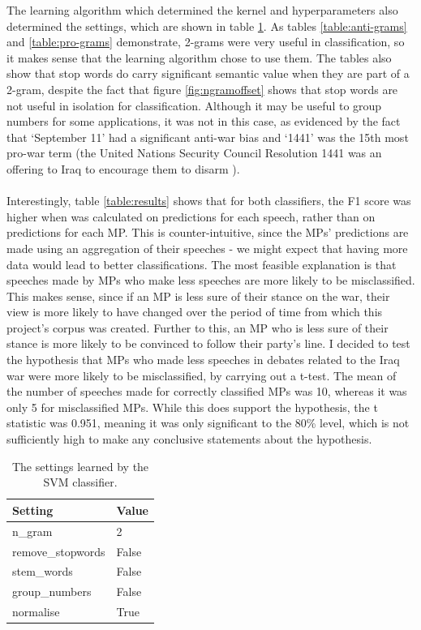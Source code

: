 \documentclass[12pt,a4paper,twoside,openright]{report}
\begin{document}
The learning algorithm which determined the kernel and hyperparameters also determined the settings, which are shown in table \ref{table:settings}. As tables \ref{table:anti-grams} and \ref{table:pro-grams} demonstrate, 2-grams were very useful in classification, so it makes sense that the learning algorithm chose to use them. The tables also show that stop words do carry significant semantic value when they are part of a 2-gram, despite the fact that figure \ref{fig:ngramoffset} shows that stop words are not useful in isolation for classification. Although it may be useful to group numbers for some applications, it was not in this case, as evidenced by the fact that `September 11' had a significant anti-war bias and `1441' was the 15th most pro-war term (the United Nations Security Council Resolution 1441 was an offering to Iraq to encourage them to disarm \cite{resolution}).
\\\\
Interestingly, table \ref{table:results} shows that for both classifiers, the F1 score was higher when was calculated on predictions for each speech, rather than on predictions for each MP. This is counter-intuitive, since the MPs' predictions are made using an aggregation of their speeches - we might expect that having more data would lead to better classifications. The most feasible explanation is that speeches made by MPs who make less speeches are more likely to be misclassified. This makes sense, since if an MP is less sure of their stance on the war, their view is more likely to have changed over the period of time from which this project's corpus was created. Further to this, an MP who is less sure of their stance is more likely to be convinced to follow their party's line. I decided to test the hypothesis that MPs who made less speeches in debates related to the Iraq war were more likely to be misclassified, by carrying out a t-test. The mean of the number of speeches made for correctly classified MPs was 10, whereas it was only 5 for misclassified MPs. While this does support the hypothesis, the t statistic was 0.951, meaning it was only significant to the 80\% level, which is not sufficiently high to make any conclusive statements about the hypothesis.

\begin{table}[]
	\centering
	\begin{tabular}{ll}
		\hline
		\textbf{Setting}  & \textbf{Value} \\ \hline
		n\_gram           & 2              \\ 
		remove\_stopwords & False          \\
		stem\_words       & False          \\
		group\_numbers    & False          \\
		normalise         & True           \\
		\hline
	\end{tabular}
	\caption{The settings learned by the SVM classifier.}
	\label{table:settings}	
\end{table}
\end{document}
